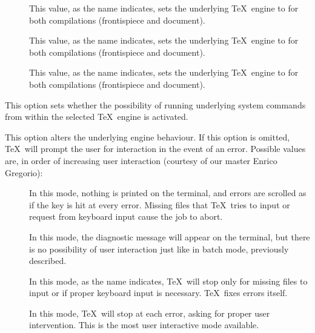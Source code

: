 \begin{description}
\begin{description}
\begin{description}
\item[] This value, as the name indicates, sets the underlying \TeX\ engine to  for both compilations (frontispiece and document).

\item[] This value, as the name indicates, sets the underlying \TeX\ engine to  for both compilations (frontispiece and document).

\item[] This value, as the name indicates, sets the underlying \TeX\ engine to  for both compilations (frontispiece and document).
\end{description}

\item[\rpsbox{shell}] This option sets whether the possibility of running underlying system commands from within the selected \TeX\ engine is activated.

\item[\abox{interaction}] This option alters the underlying engine behaviour. If this option is omitted, \TeX\ will prompt the user for interaction in the event of an error. Possible values are, in order of increasing user interaction (courtesy of our master Enrico Gregorio):

\begin{description}
\item[] In this mode, nothing is printed on the terminal, and errors are scrolled as if the  key is hit at every error. Missing files that \TeX\ tries to input or request from keyboard input cause the job to abort.

\item[] In this mode, the diagnostic message will appear on the terminal, but there is no possibility of user interaction just like in batch mode, previously described.

\item[] In this mode, as the name indicates, \TeX\ will stop only for missing files to input or if proper keyboard input is necessary. \TeX\ fixes errors itself.

\item[] In this mode, \TeX\ will stop at each error, asking for proper user intervention. This is the most user interactive mode available.
\end{description}


\end{description}
\end{description}
